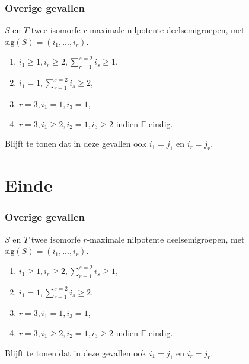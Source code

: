 \documentclass[12pt]{beamer}
\newcommand{\F}{\mathbb{F}}
\newcommand{\sig}{\mathrm{sig}}
\begin{document}
\begin{frame}
\frametitle{Overige gevallen}

\begin{block}{}
$S$ en $T$ twee isomorfe $r$-maximale nilpotente deelsemigroepen, met $\sig(S) = (i_1, ...,i_r)$.

\begin{enumerate}
\item $i_1 \geq 1, i_r \geq 2, \sum_{r-1}^{s=2} i_s \geq 1 $,
\item $i_1 = 1, \sum_{r-1}^{s=2} i_s \geq 2 $,
\item $r=3, i_1 = 1, i_3 = 1 $,
\item $r=3, i_1 \geq 2, i_2 = 1, i_3 \geq 2 $ indien $\F$ eindig.
\end{enumerate}

\end{block}

\begin{block}{}
Blijft te tonen dat in deze gevallen ook $i_1 = j_1$ en $i_r = j_r$. 
\end{block}

\end{frame}


\section{Einde}

\begin{frame}
\frametitle{{\color{iets}Overige gevallen}}

\begin{block}{}
{\color{lightgray}$S$ en $T$ twee isomorfe $r$-maximale nilpotente deelsemigroepen, met $\sig(S) = (i_1, ...,i_r)$.}

\begin{enumerate}[-]
\item {\color{lightgray}$i_1 \geq 1, i_r \geq 2, \sum_{r-1}^{s=2} i_s \geq 1 $,}
\item {\color{lightgray}$i_1 = 1, \sum_{r-1}^{s=2} i_s \geq 2 $,}
\item {\color{lightgray}$r=3, i_1 = 1, i_3 = 1 $,}
\item {\color{lightgray}$r=3, i_1 \geq 2, i_2 = 1, i_3 \geq 2 $ indien $\F$ eindig.}
\end{enumerate}

\end{block}

\begin{block}{}
{\color{lightgray}Blijft te tonen dat in deze gevallen ook $i_1 = j_1$ en $i_r = j_r$.}
\end{block}

\end{frame}
\end{document}
